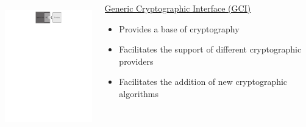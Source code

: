 \begin{frame}

\begin{columns}

\begin{column}{0.475\textwidth}

\vspace{1.5cm}

\includegraphics[trim=8cm 22cm 7cm 0cm, height=5.5cm]{figures/oli_intro.pdf}
\end{column}

\begin{column}{0.525\textwidth}

\underline{Generic Cryptographic Interface (GCI)}
\begin{itemize}
  \item Provides a base of cryptography
  \item Facilitates the support of different cryptographic providers
  \item Facilitates the addition of new cryptographic algorithms

\end{itemize}

\end{column}

\end{columns}

\end{frame}





